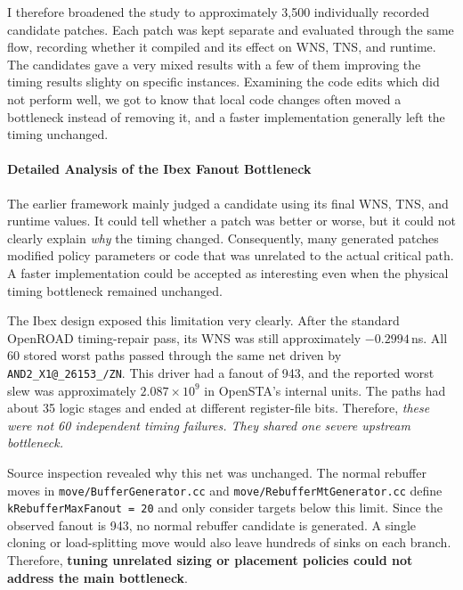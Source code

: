 \documentclass[10pt, conference]{IEEEtran}
\begin{document}
I therefore broadened the study to approximately 3{,}500 individually recorded candidate patches. Each patch was kept separate and evaluated through the same flow, recording whether it compiled and its effect on WNS, TNS, and runtime. The candidates gave a very mixed results with a few of them improving the timing results slighty on specific instances. Examining the code edits which did not perform well, we got to know that local code changes often moved a bottleneck instead of removing it, and a faster implementation generally left the timing unchanged.


\paragraph{Detailed Analysis of the Ibex Fanout Bottleneck} The earlier framework mainly judged a candidate using its final WNS, TNS, and runtime values. It could tell whether a patch was better or worse, but it could not clearly explain \emph{why} the timing changed. Consequently, many generated patches modified policy parameters or code that was unrelated to the actual critical path. A faster implementation could be accepted as interesting even when the physical timing bottleneck remained unchanged.

The Ibex design exposed this limitation very clearly. After the standard OpenROAD timing-repair pass, its WNS was still approximately $-0.2994$\,ns. All 60 stored worst paths passed through the same net driven by \texttt{AND2\_X1@\_26153\_/ZN}. This driver had a fanout of 943, and the reported worst slew was approximately $2.087 \times 10^9$ in OpenSTA's internal units. The paths had about 35 logic stages and ended at different register-file bits. Therefore, \textit{these were not 60 independent timing failures. They shared one severe upstream bottleneck.}

Source inspection revealed why this net was unchanged. The normal rebuffer moves in \texttt{move/BufferGenerator.cc} and \texttt{move/RebufferMtGenerator.cc} define \texttt{kRebufferMaxFanout = 20} and only consider targets below this limit. Since the observed fanout is 943, no normal rebuffer candidate is generated. A single cloning or load-splitting move would also leave hundreds of sinks on each branch. Therefore, \textbf{tuning unrelated sizing or placement policies could not address the main bottleneck}.
\end{document}
